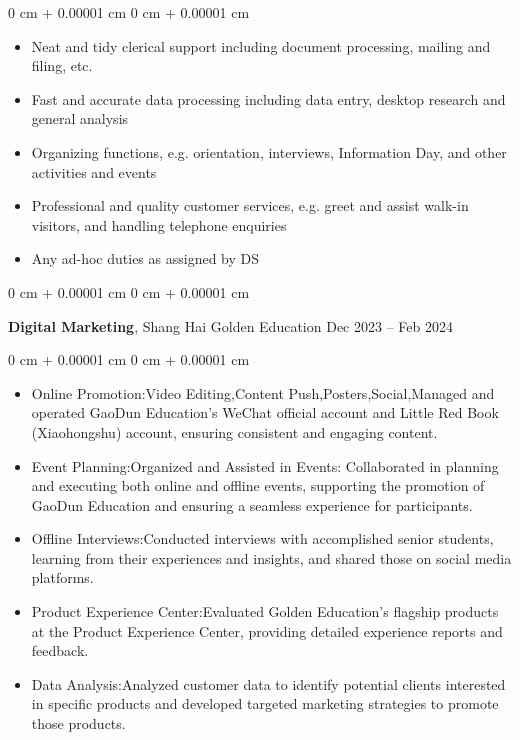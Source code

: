 \documentclass[10pt, letterpaper]{article}
\newenvironment{highlights}{
    \begin{itemize}[
        topsep=0.10 cm,
        parsep=0.10 cm,
        partopsep=0pt,
        itemsep=0pt,
        leftmargin=0 cm + 10pt
    ]
}{
    \end{itemize}
} %
\newenvironment{onecolentry}{
    \begin{adjustwidth}{
        0 cm + 0.00001 cm
    }{
        0 cm + 0.00001 cm
    }
}{
    \end{adjustwidth}
} %
\newenvironment{twocolentry}[2][]{
    \onecolentry
    \def\secondColumn{#2}
    \setcolumnwidth{\fill, 4.5 cm}
    \begin{paracol}{2}
}{
    \switchcolumn \raggedleft \secondColumn
    \end{paracol}
    \endonecolentry
} %
\begin{document}
        \vspace{0.10 cm}
        \begin{onecolentry}
            \begin{highlights}
                \item Neat and tidy clerical support including document processing, mailing and filing, etc.
                \item Fast and accurate data processing including data entry, desktop research and general analysis
                \item Organizing functions, e.g. orientation, interviews, Information Day, and other activities and events
                \item Professional and quality customer services, e.g. greet and assist walk-in visitors, and handling telephone enquiries
                \item Any ad-hoc duties as assigned by DS

            \end{highlights}
        \end{onecolentry}


        \vspace{0.2 cm}
        \begin{twocolentry}{
            Dec 2023 – Feb 2024
        }
            \textbf{Digital Marketing}, Shang Hai Golden Education \end{twocolentry}

        \vspace{0.10 cm}
        \begin{onecolentry}
            \begin{highlights}
                \item Online Promotion:Video Editing,Content Push,Posters,Social,Managed and operated GaoDun Education's WeChat official account and Little Red Book (Xiaohongshu) account, ensuring consistent and engaging content.
                \item Event Planning:Organized and Assisted in Events: Collaborated in planning and executing both online and offline events, supporting the promotion of GaoDun Education and ensuring a seamless experience for participants.

                \item Offline Interviews:Conducted interviews with accomplished senior students, learning from their experiences and insights, and shared those on social media platforms.
                \item Product Experience Center:Evaluated Golden Education's flagship products at the Product Experience Center, providing detailed experience reports and feedback.
                \item Data Analysis:Analyzed customer data to identify potential clients interested in specific products and developed targeted marketing strategies to promote those products.
            \end{highlights}
        \end{onecolentry}
        
\end{document}
